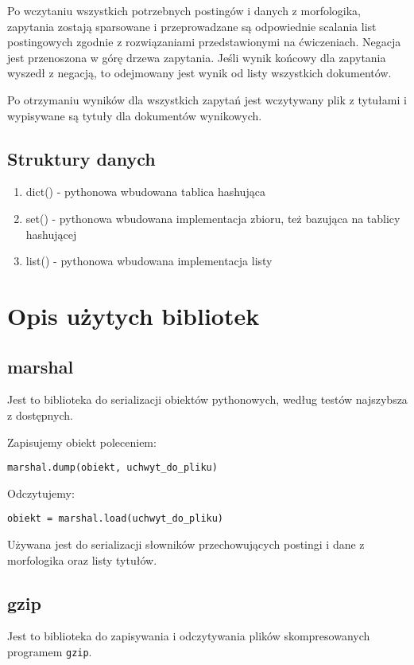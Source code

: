 \documentclass[11pt]{article}
\begin{document}
Po wczytaniu wszystkich potrzebnych postingów i danych z morfologika, zapytania zostają sparsowane i przeprowadzane są odpowiednie scalania list postingowych zgodnie z rozwiązaniami przedstawionymi na ćwiczeniach. Negacja jest przenoszona w górę drzewa zapytania. Jeśli wynik końcowy dla zapytania wyszedł z negacją, to odejmowany jest wynik od listy wszystkich dokumentów.

Po otrzymaniu wyników dla wszystkich zapytań jest wczytywany plik z tytułami i wypisywane są tytuły dla dokumentów wynikowych.

\subsection{Struktury danych}
\begin{enumerate}
\item dict() - pythonowa wbudowana tablica hashująca
\item set() - pythonowa wbudowana implementacja zbioru, też bazująca na tablicy hashującej
\item list() - pythonowa wbudowana implementacja listy
\end{enumerate}

\section{Opis użytych bibliotek}

\subsection{marshal}
Jest to biblioteka do serializacji obiektów pythonowych, według testów najszybsza z dostępnych.

Zapisujemy obiekt poleceniem:
\begin{verbatim}
marshal.dump(obiekt, uchwyt_do_pliku)
\end{verbatim}
Odczytujemy:
\begin{verbatim}
obiekt = marshal.load(uchwyt_do_pliku)
\end{verbatim}

Używana jest do serializacji słowników przechowujących postingi i dane z morfologika oraz listy tytułów.

\subsection{gzip}
Jest to biblioteka do zapisywania i odczytywania plików skompresowanych programem \texttt{gzip}.
\end{document}
